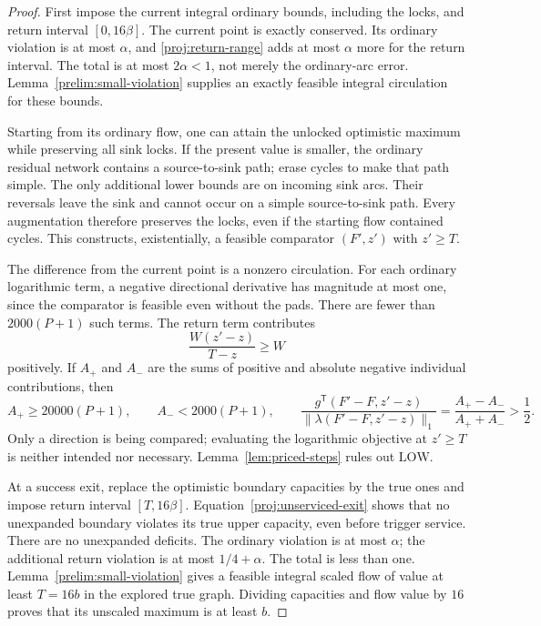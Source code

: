 \begin{proof}
First impose the current integral ordinary bounds, including the
locks, and return interval \([0,16\beta]\).
The current point is exactly conserved.  Its ordinary violation
is at most \(\alpha\), and
\eqref{proj:return-range} adds at most \(\alpha\) more for the
return interval.  The total is at most \(2\alpha<1\), not merely
the ordinary-arc error.  Lemma~\ref{prelim:small-violation} supplies
an exactly feasible integral circulation for these bounds.

Starting from its ordinary flow, one can attain the unlocked
optimistic maximum while preserving all sink locks.  If the
present value is smaller, the ordinary residual network contains
a source-to-sink path; erase cycles to make that path simple.
The only additional lower bounds are on incoming sink arcs.
Their reversals leave the sink and cannot occur on a simple
source-to-sink path.  Every augmentation therefore preserves
the locks, even if the starting flow contained cycles.
This constructs, existentially, a feasible comparator
\((F',z')\) with \(z'\ge T\).

The difference from the current point is a nonzero circulation.
For each ordinary logarithmic term, a negative directional
derivative has magnitude at most one, since the comparator is
feasible even without the pads.  There are fewer than
\(2000(P+1)\) such terms.  The return term contributes
\[
                 \frac{W(z'-z)}{T-z}\ge W
\]
positively.  If \(A_+\) and \(A_-\) are the sums of positive and
absolute negative individual contributions, then
\[
 A_+\ge20000(P+1),\qquad A_-<2000(P+1),\qquad
 \frac{g^{\mathsf T}(F'-F,z'-z)}
      {\|\lambda(F'-F,z'-z)\|_1}
       =\frac{A_+-A_-}{A_++A_-}>\frac12 .
 \]
Only a direction is being compared; evaluating the logarithmic
objective at \(z'\ge T\) is neither intended nor necessary.
Lemma~\ref{lem:priced-steps} rules out \(\mathrm{LOW}\).

At a success exit, replace the optimistic boundary capacities by
the true ones and impose return interval \([T,16\beta]\).
Equation~\eqref{proj:unserviced-exit} shows that no unexpanded
boundary violates its true upper capacity, even before trigger
service.  There are no unexpanded deficits.  The ordinary
violation is at most \(\alpha\); the additional return violation
is at most \(1/4+\alpha\).  The total is less than one.
Lemma~\ref{prelim:small-violation} gives a feasible integral scaled
flow of value at least \(T=16b\) in the explored true graph.
Dividing capacities and flow value by \(16\) proves that its
unscaled maximum is at least \(b\).
\end{proof}


